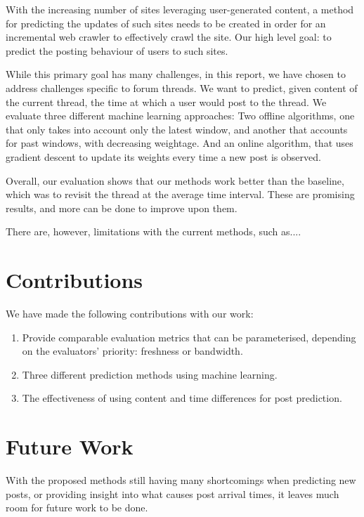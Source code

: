 With the increasing number of sites leveraging user-generated content, a method 
for predicting the updates of such sites needs to be created in order for an 
incremental web crawler to effectively crawl the site. Our high level goal: to 
predict the posting behaviour of users to such sites.

While this primary goal has many challenges, in this report, we have chosen to 
address challenges specific to forum threads. We want to predict, given content 
of the current thread, the time at which a user would post to the thread. We 
evaluate three different machine learning approaches: Two offline algorithms, 
one that only takes into account only the latest window, and another that 
accounts for past windows, with decreasing weightage. And an online algorithm, 
that uses gradient descent to update its weights every time a new post is 
observed.

Overall, our evaluation shows that our methods work better than the baseline, 
which was to revisit the thread at the average time interval. These are 
promising results, and more can be done to improve upon them. 

There are, however, limitations with the current methods, such as....


\section{Contributions}
We have made the following contributions with our work:
\begin{enumerate}
\item Provide comparable evaluation metrics that can be parameterised, depending 
on the evaluators' priority: freshness or bandwidth.

\item Three different prediction methods using machine learning.
\item The effectiveness of using content and time differences for post 
prediction.
\end{enumerate}

\section{Future Work}

With the proposed methods still having many shortcomings when predicting new 
posts, or providing insight into what causes post arrival times, it leaves much 
room for future work to be done.

